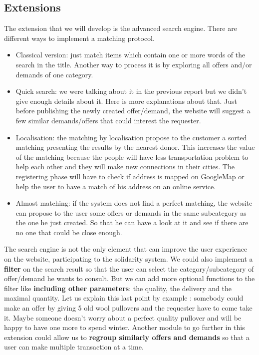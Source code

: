 \subsection{Extensions} %
The extension that we will develop is the advanced search engine. There are different ways to implement a matching protocol. 
\begin{itemize}
\item Classical version: just match items which contain one or more words of the search in the title. Another way to process it is by exploring all offers and/or demands of one category.
\item Quick search: we were talking about it in the previous report but we didn't give enough details about it. Here is more explanations about that. Just before publishing the newly created offer/demand, the website will suggest a few similar demands/offers that could interest the requester.
\item Localisation: the matching by localisation propose to the customer a sorted matching presenting the results by the nearest donor. This increases the value of the matching because the people will have less transportation problem to help each other and they will make new connections in their cities. The registering phase will have to check if address is mapped on GoogleMap or help the user to have a match of his address on an online service.
\item Almost matching: if the system does not find a perfect matching, the website can propose to the user some offers or demands in the same subcategory as the one he just created. So that he can have a look at it and see if there are no one that could be close enough.
\end{itemize}
The search engine is not the only element that can improve the user experience on the website, participating to the solidarity system. We could also implement a \textbf{filter} on the search result so that the user can select the category/subcategory of offer/demand he wants to consult. But we can add more optional functions to the filter like \textbf{including other parameters}: the quality, the delivery and the maximal quantity. Let us explain this last point by example : somebody could make an offer by giving 5 old wool pullovers and the requester have to come take it. Maybe someone doesn't worry about a perfect quality pullover and will be happy to have one more to spend winter. Another module to go further in this extension could allow us to \textbf{regroup similarly offers and demands} so that a user can make multiple transaction at a time.


